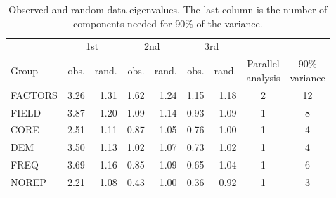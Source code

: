 \documentclass[11pt,a4paper]{article}
\begin{document}
\begin{table}[ht]
\centering\small
\begin{tabular}{@{}l r r r r r r c c@{}}
\toprule
 & \multicolumn{2}{c}{1st} & \multicolumn{2}{c}{2nd} & \multicolumn{2}{c}{3rd} & & \\
\cmidrule(lr){2-3}\cmidrule(lr){4-5}\cmidrule(lr){6-7}
Group & obs. & rand. & obs. & rand. & obs. & rand. & \shortstack{Parallel\\analysis} & \shortstack{90\%\\variance}\\
\midrule
FACTORS & 3.26 & 1.31 & 1.62 & 1.24 & 1.15 & 1.18 & 2 & 12\\
FIELD & 3.87 & 1.20 & 1.09 & 1.14 & 0.93 & 1.09 & 1 & 8\\
CORE & 2.51 & 1.11 & 0.87 & 1.05 & 0.76 & 1.00 & 1 & 4\\
DEM & 3.50 & 1.13 & 1.02 & 1.07 & 0.73 & 1.02 & 1 & 4\\
FREQ & 3.69 & 1.16 & 0.85 & 1.09 & 0.65 & 1.04 & 1 & 6\\
NOREP & 2.21 & 1.08 & 0.43 & 1.00 & 0.36 & 0.92 & 1 & 3\\
\bottomrule
\end{tabular}
\caption{Observed and random-data eigenvalues. The last column is the number of components needed for 90\% of the variance.}
\label{tab:app-eig}
\end{table}
\end{document}
